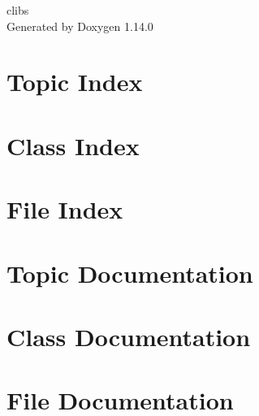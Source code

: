 \documentclass[twoside]{book}
\newcommand{\+}{\discretionary{\mbox{\scriptsize$\hookleftarrow$}}{}{}}
\newcommand{\clearemptydoublepage}{%
    \newpage{\pagestyle{empty}\cleardoublepage}%
  }
\begin{document}
  \raggedbottom
    \hypersetup{pageanchor=false,
                bookmarksnumbered=true,
                pdfencoding=unicode
               }
  \begin{titlepage}
  \vspace*{7cm}
  \begin{center}%
  {\Large clibs}\\
  \vspace*{1cm}
  {\large Generated by Doxygen 1.14.0}\\
  \end{center}
  \end{titlepage}
  \clearemptydoublepage
  \tableofcontents
  \clearemptydoublepage
  \hypersetup{pageanchor=true}


\chapter{Topic Index}

\chapter{Class Index}

\chapter{File Index}

\chapter{Topic Documentation}

\chapter{Class Documentation}


\chapter{File Documentation}

























  \backmatter
  \newpage
  \clearemptydoublepage
  \printindex
\end{document}
